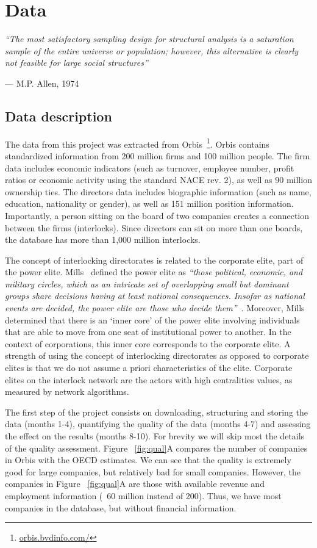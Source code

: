 \section{Data}
\label{sec:data}
\textit{``The most satisfactory sampling design for structural analysis is a saturation sample of the entire universe or population; 
however, this alternative is clearly not feasible for large social structures'' 
}
\begin{flushright}
--- M.P. Allen, 1974
\end{flushright}

\subsection{Data description}
The data from this project was extracted from Orbis~\footnote{\url{orbis.bvdinfo.com/}}.
Orbis contains standardized information from 200 million firms and 100 million people. 
The firm data includes economic indicators (such as turnover, employee number, profit ratios or economic activity using the standard NACE rev. 2),
as well as 90 million ownership ties.
The directors data includes biographic information (such as name, education, nationality or gender), 
as well as 151 million position information.
Importantly, a person sitting on the board of two companies creates a connection between the firms (interlocks).
Since directors can sit on more than one boards, 
the database has more than 1,000 million interlocks.

The concept of interlocking directorates is related to the corporate elite, part of the power elite. 
Mills~\cite{mills1957} defined the power elite as \textit{``those political, economic, and military circles, which as an intricate set of overlapping small but dominant groups share decisions having at least national consequences. Insofar as national events are decided, the power elite are those who decide them''}~\citep{mills1957}. 
Moreover, Mills determined that there is an `inner core' of the power elite involving individuals that are able to move from one seat of institutional power to another. 
In the context of corporations, this inner core corresponds to the corporate elite. 
A strength of using the concept of interlocking directorates as opposed to corporate elites is that we do not assume a priori characteristics of the elite. 
Corporate elites on the interlock network are the actors with high centralities values, as measured by network algorithms.

The first step of the project consists on downloading, structuring and storing the data (months 1-4), quantifying the quality of the data (months 4-7) and assessing the effect on the results (months 8-10). For brevity we will skip most the details of the quality assessment. Figure ~\ref{fig:qual}A compares the number of companies in Orbis with the OECD estimates. We can see that the quality is extremely good for large companies, but relatively bad for small companies. However, the companies in Figure ~\ref{fig:qual}A are those with available revenue and employment information (~60 million instead of 200). Thus, we have most companies in the database, but without financial information. 

